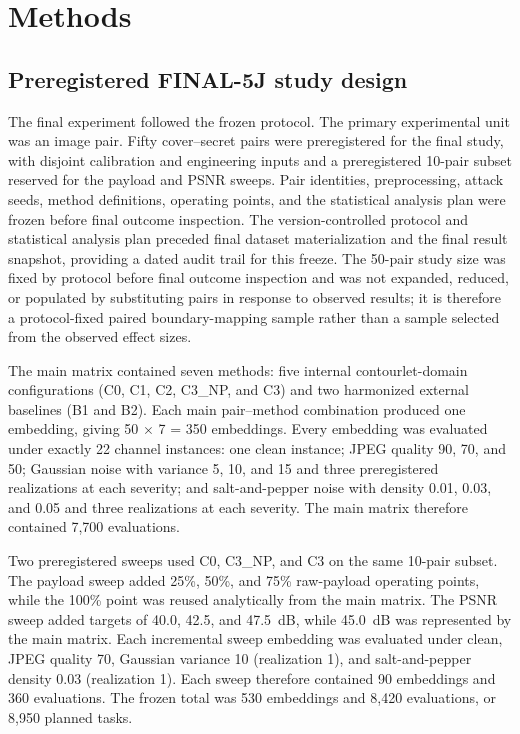 \section{Methods}

\subsection{Preregistered FINAL-5J study design}

The final experiment followed the frozen  protocol. The primary experimental unit was an image pair. Fifty cover--secret pairs were preregistered for the final study, with disjoint calibration and engineering inputs and a preregistered 10-pair subset reserved for the payload and PSNR sweeps. Pair identities, preprocessing, attack seeds, method definitions, operating points, and the statistical analysis plan were frozen before final outcome inspection. The version-controlled protocol and statistical analysis plan preceded final dataset materialization and the final result snapshot, providing a dated audit trail for this freeze. The 50-pair study size was fixed by protocol before final outcome inspection and was not expanded, reduced, or populated by substituting pairs in response to observed results; it is therefore a protocol-fixed paired boundary-mapping sample rather than a sample selected from the observed effect sizes.

The main matrix contained seven methods: five internal contourlet-domain configurations (C0, C1, C2, C3\_NP, and C3) and two harmonized external baselines (B1 and B2). Each main pair--method combination produced one embedding, giving 50 $\times$ 7 = 350 embeddings. Every embedding was evaluated under exactly 22 channel instances: one clean instance; JPEG quality 90, 70, and 50; Gaussian noise with variance 5, 10, and 15 and three preregistered realizations at each severity; and salt-and-pepper noise with density 0.01, 0.03, and 0.05 and three realizations at each severity. The main matrix therefore contained 7,700 evaluations.

Two preregistered sweeps used C0, C3\_NP, and C3 on the same 10-pair subset. The payload sweep added 25\%, 50\%, and 75\% raw-payload operating points, while the 100\% point was reused analytically from the main matrix. The PSNR sweep added targets of 40.0, 42.5, and 47.5~dB, while 45.0~dB was represented by the main matrix. Each incremental sweep embedding was evaluated under clean, JPEG quality 70, Gaussian variance 10 (realization 1), and salt-and-pepper density 0.03 (realization 1). Each sweep therefore contained 90 embeddings and 360 evaluations. The frozen total was 530 embeddings and 8,420 evaluations, or 8,950 planned tasks.

